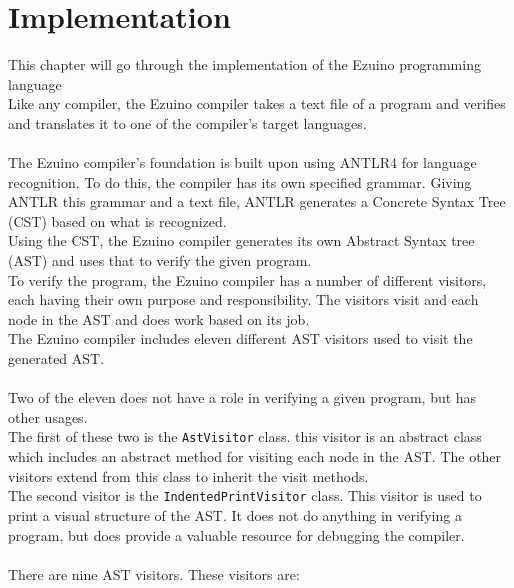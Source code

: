 \chapter{Implementation}
This chapter will go through the implementation of the Ezuino programming language\\
Like any compiler, the Ezuino compiler takes a text file of a program and verifies and translates it to one of the compiler’s target languages.
\\\\
The Ezuino compiler’s foundation is built upon using ANTLR4 for language recognition. To do this, the compiler has its own specified grammar. Giving ANTLR this grammar and a text file, ANTLR generates a Concrete Syntax Tree (CST) based on what is recognized.\\
Using the CST, the Ezuino compiler generates its own Abstract Syntax tree (AST) and uses that to verify the given program.\\
To verify the program, the Ezuino compiler has a number of different visitors, each having their own purpose and responsibility. The visitors visit and each node in the AST and does work based on its job.\\
The Ezuino compiler includes eleven different AST visitors used to visit the generated AST.
\\\\
Two of the eleven does not have a role in verifying a given program, but has other usages.\\
The first of these two is the \texttt{AstVisitor} class. this visitor is an abstract class which includes an abstract method for visiting each node in the AST. The other visitors extend from this class to inherit the visit methods.\\
The second visitor is the \texttt{IndentedPrintVisitor} class. This visitor is used to print a visual structure of the AST. It does not do anything in verifying a program, but does provide a valuable resource for debugging the compiler.
\\\\
There are nine AST visitors. These visitors are:


